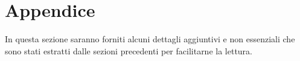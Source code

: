 \section{Appendice}
In questa sezione saranno forniti alcuni dettagli aggiuntivi e non essenziali
che sono stati estratti dalle sezioni precedenti per facilitarne 
la lettura. 

